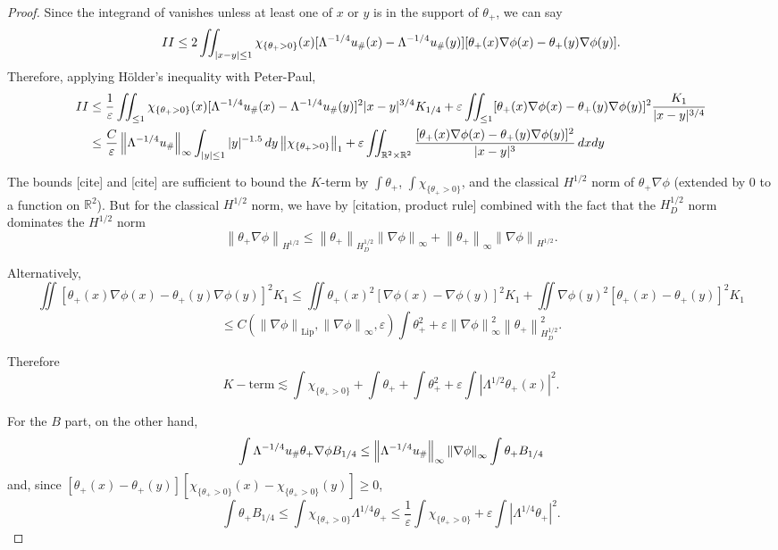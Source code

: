 \documentclass[11pt]{amsart}
\theoremstyle{remark}
\newcommand{\R}{\mathbb{R}}
\newcommand{\eps}{\varepsilon}
\newcommand{\norm}[1]{\left\lVert#1\right\rVert}
\newcommand{\abs}[1]{\left\lvert #1 \right\rvert}
\newcommand{\grad}{\nabla}
\newcommand{\indic}[1]{\chi_{\{#1\}}}
\newcommand{\uhigh}{u_{\scalebox{0.7}{\#}}}
\newcommand{\Rom}[1]{\MakeUppercase{\romannumeral #1}}
\begin{document}
\begin{proof}
Since the integrand of \Rom{2} vanishes unless at least one of $x$ or $y$ is in the support of $\theta_+$, we can say
\[ \Rom{2} \leq 2 \iint_{|x-y|\leq 1} \indic{\theta_+>0}(x) [\Lambda^{-1/4} \uhigh(x)-\Lambda^{-1/4}\uhigh(y)][\theta_+(x)\grad\phi(x)-\theta_+(y)\grad\phi(y)]. \]
Therefore, applying H\"{o}lder's inequality with Peter-Paul,
\begin{align*}
\Rom{2} &\leq \frac{1}{\eps}\iint _{\leq 1} \indic{\theta_+>0}(x) [\Lambda^{-1/4} \uhigh(x)-\Lambda^{-1/4}\uhigh(y)]^2 |x-y|^{3/4} K_{1/4} + \eps \iint_{\leq 1} [\theta_+(x)\grad\phi(x)-\theta_+(y)\grad\phi(y)]^2 \frac{K_1}{|x-y|^{3/4}}
\\ &\leq \frac{C}{\eps} \norm{\Lambda^{-1/4} \uhigh}_\infty \int_{|y|\leq 1} |y|^{-1.5} \,dy \norm{\indic{\theta_+>0}}_1 + \eps \iint_{\R^2\times\R^2} \frac{[\theta_+(x)\grad\phi(x)-\theta_+(y)\grad\phi(y)]^2}{|x-y|^3} \,dxdy
\end{align*}

The bounds [cite] and [cite] are sufficient to bound the $K$-term by $\int \theta_+$, $\int \indic{\theta_+>0}$, and the classical $H^{1/2}$ norm of $\theta_+ \grad \phi$ (extended by 0 to a function on $\R^2$).  But for the classical $H^{1/2}$ norm, we have by [citation, product rule] combined with the fact that the $H^{1/2}_D$ norm dominates the $H^{1/2}$ norm
\[ \norm{\theta_+ \grad \phi}_{H^{1/2}} \leq \norm{\theta_+}_{H^{1/2}_D} \norm{\grad\phi}_\infty + \norm{\theta_+}_\infty \norm{\grad\phi}_{H^{1/2}}. \] 

Alternatively,
\[ \iint [\theta_+(x)\grad\phi(x)-\theta_+(y)\grad\phi(y)]^2 K_1 \leq \iint \theta_+(x)^2 [\grad\phi(x)-\grad\phi(y)]^2 K_1 + \iint \grad\phi(y)^2[\theta_+(x)-\theta_+(y)]^2 K_1 \]
\[ \leq C(\norm{\grad\phi}_{\textrm{Lip}}, \norm{\grad\phi}_\infty, \eps) \int \theta_+^2 + \eps \norm{\grad\phi}_\infty^2  \norm{\theta_+}_{H_D^{1/2}}^2. \]

Therefore 
\[ K-\textrm{term} \lesssim \int \indic{\theta_+>0} + \int \theta_+ + \int \theta_+^2 + \eps \int \abs{\Lambda^{1/2} \theta_+(x)}^2. \]

For the $B$ part, on the other hand, 
\[ \int \Lambda^{-1/4} \uhigh \theta_+ \grad\phi B_{1/4} \leq \norm{\Lambda^{-1/4} \uhigh}_\infty \norm{\grad\phi}_\infty \int \theta_+ B_{1/4} \]
and, since $[\theta_+(x)-\theta_+(y)][\indic{\theta_+>0}(x)-\indic{\theta_+>0}(y)] \geq 0$,
\[ \int \theta_+ B_{1/4} \leq \int \indic{\theta_+>0} \Lambda^{1/4} \theta_+ \leq \frac{1}{\eps} \int \indic{\theta_+>0} + \eps \int \abs{\Lambda^{1/4} \theta_+}^2. \]


\end{proof}
\end{document}
